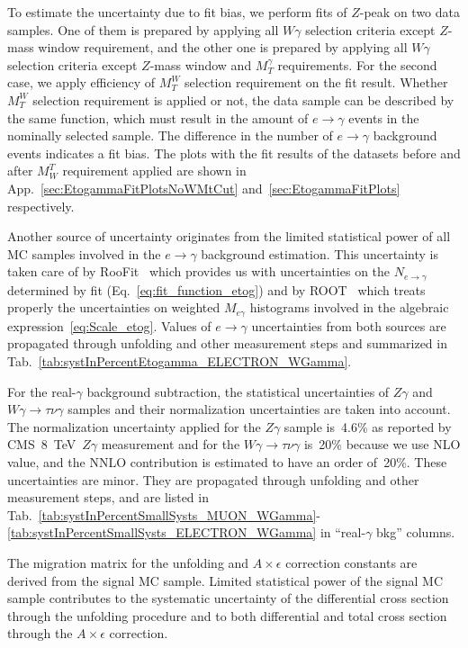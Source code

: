 To estimate the uncertainty due to fit bias, we perform fits of $Z$-peak on two data samples. One of them is prepared by applying all $W\gamma$ selection criteria except $Z$-mass window requirement, and the other one is prepared by applying all $W\gamma$ selection criteria except $Z$-mass window and $M_T^{\gamma}$ requirements. For the second case, we apply efficiency of $M_T^W$ selection requirement on the fit result. Whether $M_T^W$ selection requirement is applied or not, the data sample can be described by the same function, which must result in the amount of $e\rightarrow\gamma$ events in the nominally selected sample. The difference in the number of $e\rightarrow\gamma$ background events indicates a fit bias. The plots with the fit results of the datasets before and after $M_W^T$ requirement applied are shown in App.~\ref{sec:EtogammaFitPlotsNoWMtCut} and~\ref{sec:EtogammaFitPlots} respectively.

Another source of uncertainty originates from the limited statistical power of all MC samples involved in the $e\rightarrow\gamma$ background estimation. This uncertainty is taken care of by RooFit~\cite{ref_RooFit} which provides us with uncertainties on the $N_{e\rightarrow\gamma}$ determined by fit (Eq.~\ref{eq:fit_function_etog}) and by ROOT~\cite{ref_ROOT} which treats properly the uncertainties on weighted $M_{e\gamma}$ histograms involved in the algebraic expression~\ref{eq:Scale_etog}. Values of $e\rightarrow\gamma$ uncertainties from both sources are propagated through unfolding and other measurement steps and summarized in Tab.~\ref{tab:systInPercentEtogamma_ELECTRON_WGamma}.


For the real-$\gamma$ background subtraction, the statistical uncertainties of $Z\gamma$ and $W\gamma\rightarrow\tau\nu\gamma$ samples and their normalization uncertainties are taken into account. The normalization uncertainty applied for the $Z\gamma$ sample is~4.6\% as reported by CMS~8~TeV~$Z\gamma$ measurement and for the $W\gamma\rightarrow\tau\nu\gamma$ is~20\% because we use NLO value, and the NNLO contribution is estimated to have an order of~20\%. These uncertainties are minor.  They are propagated through unfolding and other measurement steps, and are listed in Tab.~\ref{tab:systInPercentSmallSysts_MUON_WGamma}-\ref{tab:systInPercentSmallSysts_ELECTRON_WGamma} in ``real-$\gamma$ bkg'' columns.


The migration matrix for the unfolding and $A\times\epsilon$ correction constants are derived from the signal MC sample. Limited statistical power of the signal MC sample contributes to the systematic uncertainty of the differential cross section through the unfolding procedure and to both differential and total cross section through the  $A\times\epsilon$ correction. 

